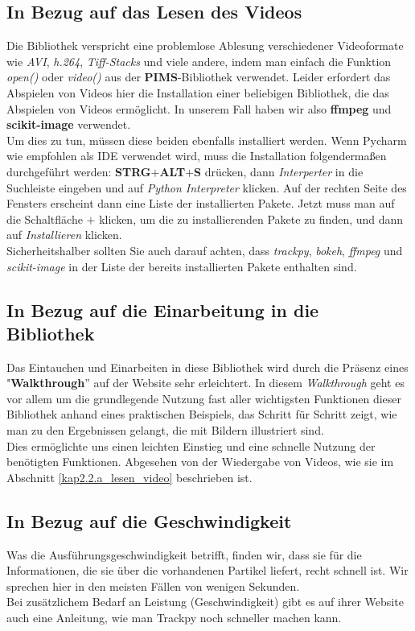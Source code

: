 \subsection{In Bezug auf das Lesen des Videos \label{kap2.2.a_lesen_video}}
Die Bibliothek verspricht eine problemlose Ablesung verschiedener Videoformate wie \textit{AVI}, \textit{h.264}, \textit{Tiff-Stacks} und viele andere, indem man einfach die Funktion \textit{open()} oder \textit{video()} aus der \textbf{PIMS}-Bibliothek \cite{pims} verwendet. Leider erfordert das Abspielen von Videos hier die Installation einer beliebigen Bibliothek, die das Abspielen von Videos ermöglicht. In unserem Fall haben wir also \textbf{ffmpeg} und \textbf{scikit-image} verwendet.\\
Um dies zu tun, müssen diese beiden ebenfalls installiert werden. Wenn Pycharm wie empfohlen als IDE verwendet wird, muss die Installation folgendermaßen durchgeführt werden:  \textbf{STRG$+$ALT$+$S} drücken, dann \textit{Interperter} in die Suchleiste eingeben und  auf \textit{Python Interpreter} klicken. 
Auf der rechten Seite des Fensters erscheint dann eine Liste der installierten Pakete. Jetzt muss man auf die Schaltfläche $+$ klicken, um die zu installierenden Pakete zu finden, und dann auf \textit{Installieren} klicken.\\
Sicherheitshalber sollten Sie auch darauf achten, dass \textit{trackpy}, \textit{bokeh}, \textit{ffmpeg} und \textit{scikit-image} in der Liste der bereits installierten Pakete enthalten sind. 

\subsection{In Bezug auf die Einarbeitung in die Bibliothek \label{kap2.2.b_einarbeitung}}

Das Eintauchen und Einarbeiten in diese Bibliothek wird durch die Präsenz eines "\textbf{Walkthrough}''  auf der Website sehr erleichtert.  In diesem \textit{Walkthrough} geht es vor allem um die grundlegende Nutzung fast aller wichtigsten Funktionen dieser Bibliothek anhand eines praktischen Beispiels, das Schritt für Schritt zeigt, wie man zu den Ergebnissen gelangt, die mit Bildern illustriert sind.\\
Dies ermöglichte uns einen leichten Einstieg und eine schnelle Nutzung der benötigten Funktionen. Abgesehen von der Wiedergabe von Videos, wie sie im Abschnitt  \ref{kap2.2.a_lesen_video} beschrieben ist.


\subsection{In Bezug auf die Geschwindigkeit \label{kap2.2.c_geschwindigkeit}}
Was die Ausführungsgeschwindigkeit betrifft, finden wir, dass sie für die Informationen, die sie über die vorhandenen Partikel liefert, recht schnell ist.  Wir sprechen hier in den meisten Fällen von wenigen Sekunden. \\
Bei zusätzlichem Bedarf an Leistung (Geschwindigkeit) gibt es auf ihrer Website auch eine Anleitung, wie man Trackpy noch schneller machen kann.

